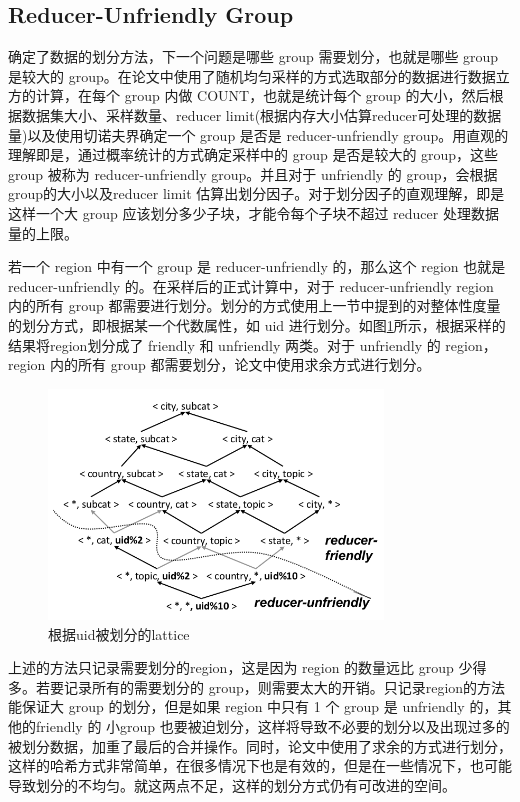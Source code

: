 \subsection{Reducer-Unfriendly Group}

确定了数据的划分方法，下一个问题是哪些 group 需要划分，也就是哪些 group 是较大的 group。在论文中使用了随机均匀采样的方式选取部分的数据进行数据立方的计算，在每个 group 内做 COUNT，也就是统计每个 group 的大小，然后根据数据集大小、采样数量、reducer limit(根据内存大小估算reducer可处理的数据量)以及使用切诺夫界确定一个 group 是否是 reducer-unfriendly group。用直观的理解即是，通过概率统计的方式确定采样中的 group 是否是较大的 group，这些 group 被称为 reducer-unfriendly group。并且对于 unfriendly 的 group，会根据group的大小以及reducer limit 估算出划分因子。对于划分因子的直观理解，即是这样一个大 group 应该划分多少子块，才能令每个子块不超过 reducer 处理数据量的上限。

若一个 region 中有一个 group 是 reducer-unfriendly 的，那么这个 region 也就是 reducer-unfriendly 的。在采样后的正式计算中，对于 reducer-unfriendly region 内的所有 group 都需要进行划分。划分的方式使用上一节中提到的对整体性度量的划分方式，即根据某一个代数属性，如 uid 进行划分。如图\ref{region_partition}所示，根据采样的结果将region划分成了 friendly 和 unfriendly 两类。对于 unfriendly 的 region，region 内的所有 group 都需要划分，论文中使用求余方式进行划分。

\begin{figure}[!htb]
\centering\includegraphics[width=3.5in]{picture/ch_datacube_mr/region_partition} 
\caption{根据uid被划分的lattice}\label{region_partition} 
\end{figure} 

上述的方法只记录需要划分的region，这是因为 region 的数量远比 group 少得多。若要记录所有的需要划分的 group，则需要太大的开销。只记录region的方法能保证大 group 的划分，但是如果 region 中只有 1 个 group 是 unfriendly 的，其他的friendly 的 小group 也要被迫划分，这样将导致不必要的划分以及出现过多的被划分数据，加重了最后的合并操作。同时，论文中使用了求余的方式进行划分，这样的哈希方式非常简单，在很多情况下也是有效的，但是在一些情况下，也可能导致划分的不均匀。就这两点不足，这样的划分方式仍有可改进的空间。

